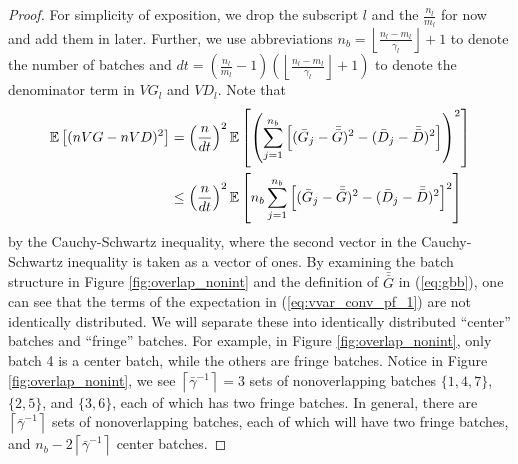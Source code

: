 \documentclass[12pt]{article}
\newcommand{\e}[1]{\mathbb{E} \left[ #1 \right]
}
\newcommand{\nbl}{\left\lfloor\tfrac{n_l-m_l}{\gamma_l}\right\rfloor+1}
\newcommand{\gammab}{\bar{\gamma}}
\newcommand{\gb}{\bar{G}}
\newcommand{\gbb}{\bar{\gb}}
\newcommand{\db}{\bar{D}}
\newcommand{\dbb}{\bar{\db}}
\begin{document}
\begin{proof}
	For simplicity of exposition, we drop the subscript $l$ and the $\frac{n_l}{m_l}$ for now and add them in later.  
        Further, we use abbreviations $n_b = \nbl$ to denote the number of batches and $dt = \left(\tfrac{n_l}{m_l} - 1\right) \left(\nbl\right)$ to denote the denominator term in $VG_l$ and $VD_l$. Note that
	\begin{align}
		\e{(nVG - nVD)^2} & = \left( \frac{n}{dt} \right)^2 \e{ \left( \sum_{j=1}^{n_b} \left[ (\gb_j - \gbb)^2 - (\db_j - \dbb)^2 \right] \right)^2 } \notag \\
		& \leq \left( \frac{n}{dt} \right)^2 \e{ n_b \sum_{j=1}^{n_b} \left[ (\gb_j - \gbb)^2 - (\db_j - \dbb)^2 \right]^2 } \label{eq:vvar_conv_pf_1}
	\end{align}
	by the Cauchy-Schwartz inequality, where the second vector in the Cauchy-Schwartz inequality is taken as a vector of ones.  
        By examining the batch structure in Figure \ref{fig:overlap_nonint} and the definition of $\gbb$ in (\ref{eq:gbb}), one can see that the terms of the expectation in (\ref{eq:vvar_conv_pf_1}) are not identically distributed.  
        We will separate these into identically distributed ``center'' batches and ``fringe'' batches.  
        For example, in Figure \ref{fig:overlap_nonint}, only batch 4 is a center batch, while the others are fringe batches.  
        Notice in Figure \ref{fig:overlap_nonint}, we see $\left\lceil \gammab^{-1} \right\rceil = 3$ sets of nonoverlapping batches $\{1,4,7\}$, $\{2,5\}$, and $\{3,6\}$, each of which has two fringe batches.  
        In general, there are $\left\lceil \gammab^{-1} \right\rceil$ sets of nonoverlapping batches, each of which will have two fringe batches, and $n_b - 2\left\lceil \gammab^{-1} \right\rceil$ center batches.
	

\end{proof}
\end{document}
